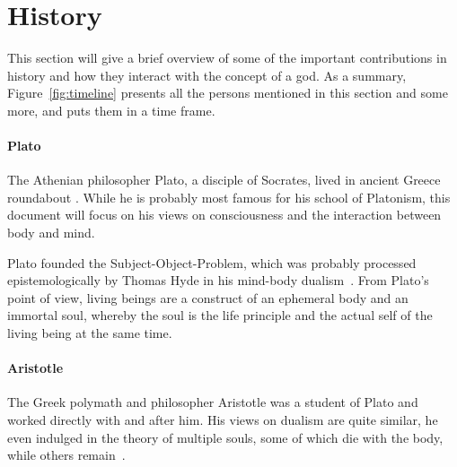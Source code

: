 \section{History}
\label{sec:History}

\begin{figure*}
    \caption[The Timeline]{Timeline of the presented persons. Those grayed out are left as a reference for other mentions in this document~\cite{wikimedia2021}. Rounded rectangles ( and ) denote the full life span of the respective person.}
    \label{fig:timeline}
\end{figure*}

This section will give a brief overview of some of the important contributions in history and how they interact with the concept of a god.
As a summary, Figure~\ref{fig:timeline} presents all the persons mentioned in this section and some more, and puts them in a time frame.

\paragraph{Plato}
The Athenian philosopher Plato, a disciple of Socrates, lived in ancient Greece roundabout .
While he is probably most famous for his school of Platonism, this document will focus on his views on consciousness and the interaction between body and mind.

Plato founded the Subject-Object-Problem, which was probably processed epistemologically by Thomas Hyde in his mind-body dualism~\cite{plato360}.
From Plato's point of view, living beings are a construct of an ephemeral body and an immortal soul, whereby the soul is the life principle and the actual self of the living being at the same time.


\paragraph{Aristotle}
The Greek polymath and philosopher Aristotle was a student of Plato and worked directly with and after him.
His views on dualism are quite similar, he even indulged in the theory of multiple souls, some of which die with the body, while others remain~\cite{aristotle350,hicks2015aristotle}.

